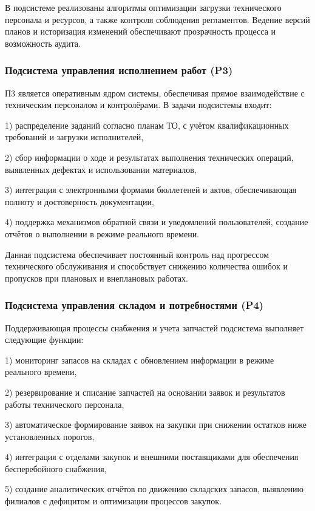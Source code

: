 \documentclass[14pt,a4paper]{extarticle}
\begin{document}
В подсистеме реализованы алгоритмы оптимизации загрузки технического персонала и ресурсов, а также контроля соблюдения регламентов. Ведение версий планов и историзация изменений обеспечивают прозрачность процесса и возможность аудита.

\subsubsection{Подсистема управления исполнением работ (P3)}

П3 является оперативным ядром системы, обеспечивая прямое взаимодействие с техническим персоналом и контролёрами. В задачи подсистемы входит: 

1) распределение заданий согласно планам ТО, с учётом квалификационных требований и загрузки исполнителей,

2) сбор информации о ходе и результатах выполнения технических операций, выявленных дефектах и использовании материалов,

3) интеграция с электронными формами бюллетеней и актов, обеспечивающая полноту и достоверность документации,

4) поддержка механизмов обратной связи и уведомлений пользователей, создание отчётов о выполнении в режиме реального времени.

Данная подсистема обеспечивает постоянный контроль над прогрессом технического обслуживания и способствует снижению количества ошибок и пропусков при плановых и внеплановых работах.

\subsubsection{Подсистема управления складом и потребностями (P4)}

Поддерживающая процессы снабжения и учета запчастей подсистема выполняет следующие функции: 

1) мониторинг запасов на складах с обновлением информации в режиме реального времени,

2) резервирование и списание запчастей на основании заявок и результатов работы технического персонала,

3) автоматическое формирование заявок на закупки при снижении остатков ниже установленных порогов,

4) интеграция с отделами закупок и внешними поставщиками для обеспечения бесперебойного снабжения,

5) создание аналитических отчётов по движению складских запасов, выявлению филиалов с дефицитом и оптимизации процессов закупок.
\end{document}
